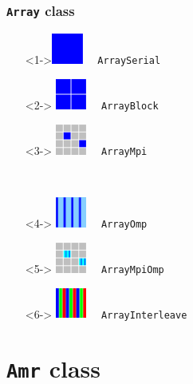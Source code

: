 \documentclass{beamer}
\newcommand{\code}[1]{\texttt{#1}}
\begin{document}
\begin{frame}
\frametitle{\code{Array} class}

\begin{minipage}{1.8in}
\begin{itemize}
\item[]<1->\includegraphics[width=0.4in]{array-serial.eps} \ \ \code{ArraySerial}
\item[]<2-> \includegraphics[width=0.4in]{array-block.eps} \ \ \code{ArrayBlock}
\item[]<3-> \includegraphics[width=0.4in]{array-mpi.eps} \ \ \code{ArrayMpi}
\end{itemize}
\end{minipage} \ 
\begin{minipage}{2in}
\begin{itemize}
\item[]<4-> \includegraphics[width=0.4in]{array-omp.eps} \ \ \code{ArrayOmp}
\item[]<5-> \includegraphics[width=0.4in]{array-mpi-omp.eps} \ \ \code{ArrayMpiOmp}
\item[]<6-> \includegraphics[width=0.4in]{array-interleave.eps} \ \ \code{ArrayInterleave}
\end{itemize}
\end{minipage}

\end{frame}

\section{\code{Amr} class}
\end{document}
